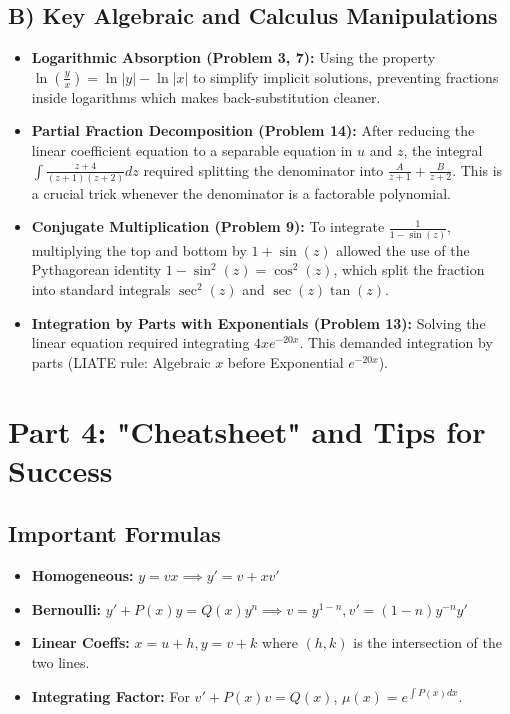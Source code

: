 \documentclass[11pt]{article}
\begin{document}
\subsection{B) Key Algebraic and Calculus Manipulations}
\begin{itemize}
    \item \textbf{Logarithmic Absorption (Problem 3, 7):} Using the property $\ln\left(\frac{y}{x}\right) = \ln|y| - \ln|x|$ to simplify implicit solutions, preventing fractions inside logarithms which makes back-substitution cleaner.
    \item \textbf{Partial Fraction Decomposition (Problem 14):} After reducing the linear coefficient equation to a separable equation in $u$ and $z$, the integral $\int \frac{z+4}{(z+1)(z+2)} dz$ required splitting the denominator into $\frac{A}{z+1} + \frac{B}{z+2}$. This is a crucial trick whenever the denominator is a factorable polynomial.
    \item \textbf{Conjugate Multiplication (Problem 9):} To integrate $\frac{1}{1-\sin(z)}$, multiplying the top and bottom by $1+\sin(z)$ allowed the use of the Pythagorean identity $1-\sin^2(z) = \cos^2(z)$, which split the fraction into standard integrals $\sec^2(z)$ and $\sec(z)\tan(z)$.
    \item \textbf{Integration by Parts with Exponentials (Problem 13):} Solving the linear equation required integrating $4xe^{-20x}$. This demanded integration by parts (LIATE rule: Algebraic $x$ before Exponential $e^{-20x}$).
\end{itemize}

\newpage
\section{Part 4: "Cheatsheet" and Tips for Success}

\subsection{Important Formulas}
\begin{itemize}
    \item \textbf{Homogeneous:} $y = vx \implies y' = v + xv'$
    \item \textbf{Bernoulli:} $y' + P(x)y = Q(x)y^n \implies v = y^{1-n}, v' = (1-n)y^{-n}y'$
    \item \textbf{Linear Coeffs:} $x = u+h, y = v+k$ where $(h,k)$ is the intersection of the two lines.
    \item \textbf{Integrating Factor:} For $v' + P(x)v = Q(x)$, $\mu(x) = e^{\int P(x)dx}$.
\end{itemize}
\end{document}
